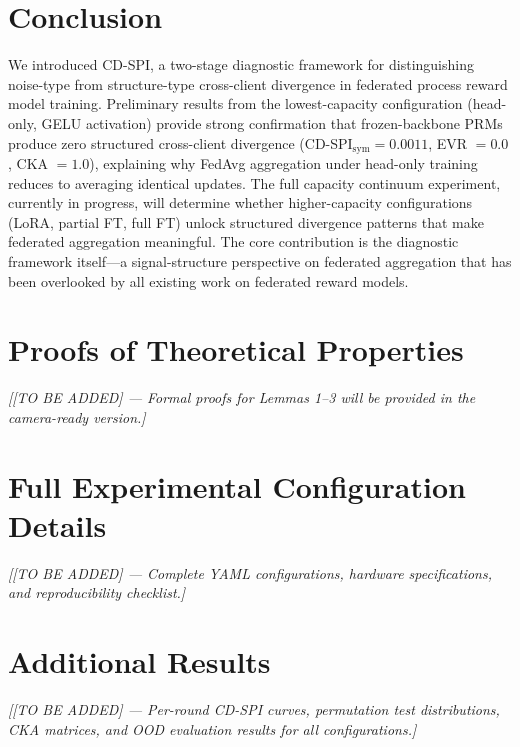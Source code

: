 \documentclass{article}
\begin{document}
\section{Conclusion}

We introduced CD-SPI, a two-stage diagnostic framework for distinguishing noise-type from structure-type cross-client divergence in federated process reward model training.
Preliminary results from the lowest-capacity configuration (head-only, GELU activation) provide strong confirmation that frozen-backbone PRMs produce zero structured cross-client divergence (CD-SPI$_{\text{sym}} = 0.0011$, EVR $=0.0$, CKA $=1.0$), explaining why FedAvg aggregation under head-only training reduces to averaging identical updates.
The full capacity continuum experiment, currently in progress, will determine whether higher-capacity configurations (LoRA, partial FT, full FT) unlock structured divergence patterns that make federated aggregation meaningful.
The core contribution is the diagnostic framework itself---a signal-structure perspective on federated aggregation that has been overlooked by all existing work on federated reward models.




\appendix
\section{Proofs of Theoretical Properties}
\label{sec:proofs}

\emph{[[TO BE ADDED] --- Formal proofs for Lemmas 1--3 will be provided in the camera-ready version.]}

\section{Full Experimental Configuration Details}

\emph{[[TO BE ADDED] --- Complete YAML configurations, hardware specifications, and reproducibility checklist.]}

\section{Additional Results}

\emph{[[TO BE ADDED] --- Per-round CD-SPI curves, permutation test distributions, CKA matrices, and OOD evaluation results for all configurations.]}
\end{document}
